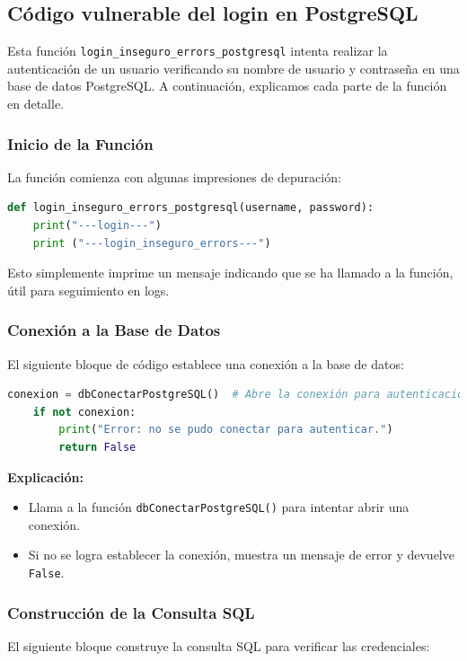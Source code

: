 \documentclass[a4paper,12pt]{article}
\begin{document}
\subsection{Código vulnerable del login en PostgreSQL}

Esta función \texttt{login\_inseguro\_errors\_postgresql} intenta realizar la autenticación de un usuario verificando su nombre de usuario y contraseña en una base de datos PostgreSQL. A continuación, explicamos cada parte de la función en detalle.

\subsubsection{Inicio de la Función}
La función comienza con algunas impresiones de depuración:

\begin{lstlisting}[language=Python]
def login_inseguro_errors_postgresql(username, password):
    print("---login---")
    print ("---login_inseguro_errors---")
\end{lstlisting}

Esto simplemente imprime un mensaje indicando que se ha llamado a la función, útil para seguimiento en logs.

\subsubsection{Conexión a la Base de Datos}
El siguiente bloque de código establece una conexión a la base de datos:

\begin{lstlisting}[language=Python]
    conexion = dbConectarPostgreSQL()  # Abre la conexión para autenticación
    if not conexion:
        print("Error: no se pudo conectar para autenticar.")
        return False
\end{lstlisting}

\textbf{Explicación:}
\begin{itemize}
    \item Llama a la función \texttt{dbConectarPostgreSQL()} para intentar abrir una conexión.
    \item Si no se logra establecer la conexión, muestra un mensaje de error y devuelve \texttt{False}.
\end{itemize}

\subsubsection{Construcción de la Consulta SQL}
El siguiente bloque construye la consulta SQL para verificar las credenciales:
\end{document}

